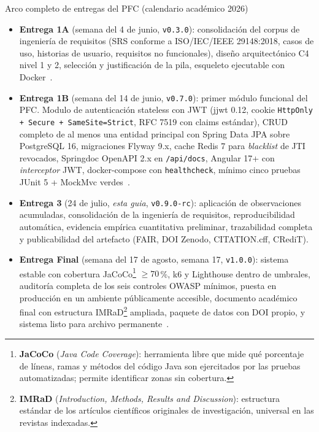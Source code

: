 \documentclass[11pt,a4paper]{article}
\begin{document}
\begin{cajadefinicion}{Arco completo de entregas del PFC (calendario acad\'{e}mico 2026)}
    \begin{itemize}
        \item \textbf{Entrega 1A} (semana del 4 de junio, \texttt{v0.3.0}): consolidaci\'{o}n del corpus de ingenier\'{i}a de requisitos (SRS conforme a ISO/IEC/IEEE 29148:2018, casos de uso, historias de usuario, requisitos no funcionales), dise\~{n}o arquitect\'{o}nico C4 nivel 1 y 2, selecci\'{o}n y justificaci\'{o}n de la pila, esqueleto ejecutable con Docker~\cite{iso29148,cockburn2001writing,cohn2004user,brown2023c4}.
        \item \textbf{Entrega 1B} (semana del 14 de junio, \texttt{v0.7.0}): primer m\'{o}dulo funcional del PFC. Modulo de autenticaci\'{o}n stateless con JWT (jjwt 0.12, cookie \texttt{HttpOnly + Secure + SameSite=Strict}, RFC 7519 con claims est\'{a}ndar), CRUD completo de al menos una entidad principal con Spring Data JPA sobre PostgreSQL 16, migraciones Flyway 9.x, cache Redis 7 para \emph{blacklist} de JTI revocados, Springdoc OpenAPI 2.x en \texttt{/api/docs}, Angular 17+ con \emph{interceptor} JWT, docker-compose con \texttt{healthcheck}, m\'{i}nimo cinco pruebas JUnit 5 + MockMvc verdes~\cite{jones2015jwt,rfc7807,walls2022spring,owasp2021top10}.
        \item \textbf{Entrega 3} (24 de julio, \emph{esta guia}, \texttt{v0.9.0-rc}): aplicaci\'{o}n de observaciones acumuladas, consolidaci\'{o}n de la ingenier\'{i}a de requisitos, reproducibilidad autom\'{a}tica, evidencia emp\'{i}rica cuantitativa preliminar, trazabilidad completa y publicabilidad del artefacto (FAIR, DOI Zenodo, CITATION.cff, CRediT).
        \item \textbf{Entrega Final} (semana del 17 de agosto, semana 17, \texttt{v1.0.0}): sistema estable con cobertura JaCoCo\footnote{\textbf{JaCoCo} (\emph{Java Code Coverage}): herramienta libre que mide qu\'{e} porcentaje de l\'{i}neas, ramas y m\'{e}todos del c\'{o}digo Java son ejercitados por las pruebas automatizadas; permite identificar zonas sin cobertura.} $\geq 70$\,\%, k6 y Lighthouse dentro de umbrales, auditor\'{i}a completa de los seis controles OWASP m\'{i}nimos, puesta en producci\'{o}n en un ambiente p\'{u}blicamente accesible, documento acad\'{e}mico final con estructura IMRaD\footnote{\textbf{IMRaD} (\emph{Introduction, Methods, Results and Discussion}): estructura est\'{a}ndar de los art\'{i}culos cient\'{i}ficos originales de investigaci\'{o}n, universal en las revistas indexadas.} ampliada, paquete de datos con DOI propio, y sistema listo para archivo permanente~\cite{owasp2021top10,ortega2022securecoding,ralph2021empirical,acm2020artifact}.
    \end{itemize}
\end{cajadefinicion}
\end{document}
